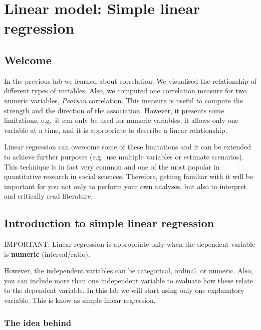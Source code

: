 \documentclass[
]{book}
\begin{document}
\hypertarget{simple-lm}{%
\chapter{Linear model: Simple linear regression}\label{simple-lm}}

\hypertarget{welcome}{%
\section{Welcome}\label{welcome}}

In the previous lab we learned about correlation. We visualised the relationship of different types of variables. Also, we computed one correlation measure for two numeric variables, \emph{Pearson} correlation. This measure is useful to compute the strength and the direction of the association. However, it presents some limitations, e.g.~it can only be used for numeric variables, it allows only one variable at a time, and it is appropriate to describe a linear relationship.

Linear regression can overcome some of these limitations and it can be extended to achieve further purposes (e.g.~use multiple variables or estimate scenarios). This technique is in fact very common and one of the most popular in quantitative research in social sciences. Therefore, getting familiar with it will be important for you not only to perform your own analyses, but also to interpret and critically read literature.

\hypertarget{introduction-to-simple-linear-regression}{%
\section{Introduction to simple linear regression}\label{introduction-to-simple-linear-regression}}

IMPORTANT: Linear regression is appropriate only when the dependent variable is \textbf{numeric} (interval/ratio).

However, the independent variables can be categorical, ordinal, or numeric. Also, you can include more than one independent variable to evaluate how these relate to the dependent variable. In this lab we will start using only one explanatory variable. This is know as simple linear regression.

\hypertarget{the-idea-behind}{%
\subsection{The idea behind}\label{the-idea-behind}}
\end{document}

